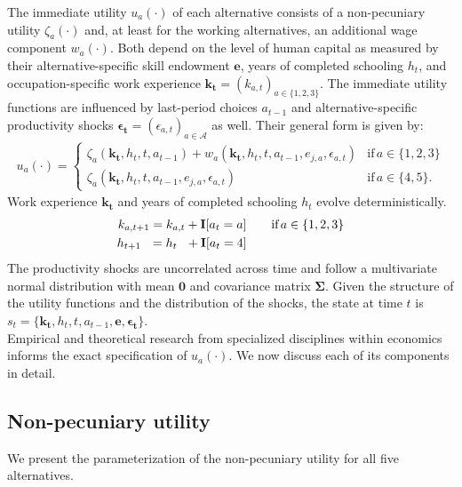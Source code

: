 \noindent The immediate utility $u_a(\cdot)$ of each alternative consists of a non-pecuniary utility $\zeta_a(\cdot)$ and, at least for the working alternatives, an additional wage component $w_a(\cdot)$. Both depend on the level of human capital as measured by their alternative-specific skill endowment $\bm{e}$, years of completed schooling $h_t$, and occupation-specific work experience $\bm{k_t} = \left(k_{a,t}\right)_{a\in\{1, 2, 3\}}$. The immediate utility functions are influenced by last-period choices $a_{t -1}$ and alternative-specific productivity shocks $\bm{\epsilon_t} = \left(\epsilon_{a,t}\right)_{a\in\mathcal{A}}$ as well. Their general form is given by:
%
\begin{align*}
u_a(\cdot) =
\begin{cases}
    \zeta_a(\bm{k_t}, h_t, t, a_{t -1})  + w_a(\bm{k_t}, h_t, t, a_{t -1}, e_{j, a}, \epsilon_{a,t})                & \text{if}\, a \in \{1, 2, 3\}  \\
    \zeta_a(\bm{k_t}, h_t, t, a_{t-1}, e_{j,a}, \epsilon_{a,t})                                                  &  \text{if}\, a \in \{4, 5\}.
\end{cases}
\end{align*}
%
Work experience $\bm{k_t}$  and years of completed schooling $h_t$ evolve deterministically.
%
\begin{align*}
	k_{a,t+1} = k_{a,t} + {\textbf{I}}[a_t = a]  & \qquad \text{if}\, a \in \{1, 2, 3\} \\
	h_{t + 1\phantom{,a}} = h_{t\phantom{,a}} +   {\textbf{I}}[a_t = 4]  & \qquad
\end{align*}
%
\noindent The productivity shocks are uncorrelated across time and follow a multivariate normal distribution with mean $\bm{0}$ and covariance matrix $\bm{\Sigma}$. Given the structure of the utility functions and the distribution of the shocks, the state at time $t$ is $s_t = \{\bm{k_t}, h_t, t, a_{t -1}, \bm{e},\bm{\epsilon_t}\}$.\\

\noindent Empirical and theoretical research from specialized disciplines within economics informs the exact specification of $u_a(\cdot)$. We now discuss each of its components in detail.
\subsection{Non-pecuniary utility}
We present the parameterization of the non-pecuniary utility for all five alternatives.
